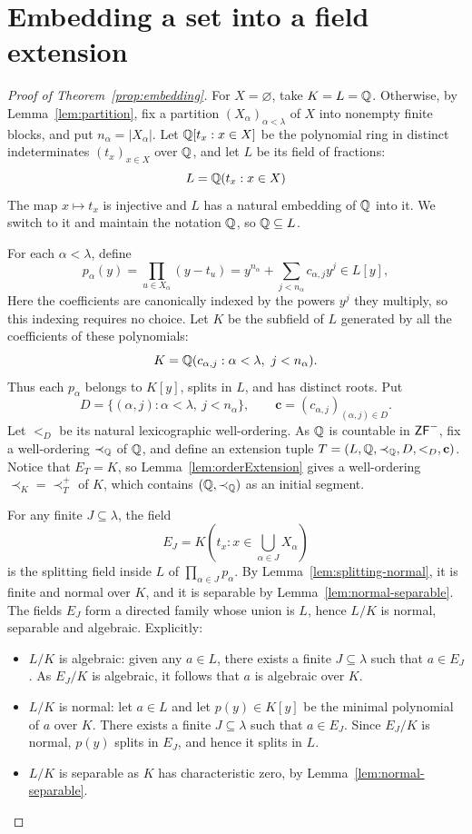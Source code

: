 \section{Embedding a set into a field extension}\label{sec:main-proof}

\begin{proof}[Proof of Theorem~\ref{prop:embedding}]
For $X=\varnothing$, take $K=L=\mathbb Q$. Otherwise, by
Lemma~\ref{lem:partition}, fix a partition $(X_\alpha)_{\alpha<\lambda}$ of $X$ into nonempty finite blocks, and put $n_\alpha=|X_\alpha|$.
Let $\mathbb Q[t_x:x\in X]$ be the polynomial ring in distinct indeterminates $(t_x)_{x\in X}$ over $\mathbb Q$, and let $L$ be its field of fractions:
\[
 L=\mathbb Q(t_x:x\in X)
\]
The map $x\mapsto t_x$ is injective and $L$ has a natural embedding of $\mathbb Q$ into it.
We switch to it and maintain the notation $\mathbb Q$, so $\mathbb Q\subseteq L$.

For each $\alpha<\lambda$, define
\[
 p_\alpha(y)=\prod_{u\in X_\alpha}(y-t_u)
            =y^{n_\alpha}+\sum_{j<n_\alpha}c_{\alpha,j}y^j
            \in L[y],
\]
Here the coefficients are canonically indexed by the powers $y^j$ they
multiply, so this indexing requires no choice.
Let $K$ be the subfield of $L$ generated by all the coefficients
of these polynomials:
\[
 K=\Q(c_{\alpha,j}:\alpha<\lambda,\ j<n_\alpha).
\]
Thus each $p_\alpha$ belongs to $K[y]$, splits in $L$, and has distinct roots.
Put
\[
 D=\{(\alpha,j):\alpha<\lambda,\ j<n_\alpha\},
 \qquad \mathbf c=(c_{\alpha,j})_{(\alpha,j)\in D}.
\]
Let $<_D$ be its natural lexicographic well-ordering.
As $\mathbb Q$ is countable in $\mathsf{ZF}^{-}$, fix a well-ordering $\prec_{\mathbb Q}$ of $\mathbb Q$,
and define an extension tuple $T=(L,\mathbb Q,\prec_{\mathbb Q},D,<_D,\mathbf c)$.
Notice that $E_T=K$, so Lemma~\ref{lem:orderExtension} gives a well-ordering
$\prec_K=\prec_T^+$ of $K$, which contains $(\mathbb Q,\prec_{\mathbb Q})$
as an initial segment.

For any finite
$J\subseteq\lambda$, the field
\[
 E_J=K(t_x:x\in\bigcup_{\alpha\in J}X_\alpha)
\]
is the splitting field inside $L$ of
$\prod_{\alpha\in J}p_\alpha$. By Lemma~\ref{lem:splitting-normal},
it is finite and normal over $K$, and it is separable by Lemma~\ref{lem:normal-separable}. The fields $E_J$ form a directed family
whose union is $L$, hence $L/K$ is normal, separable and algebraic.
Explicitly:
\begin{itemize}
    \item $L/K$ is algebraic: given any $a \in L$, there exists a finite $J\subseteq\lambda$ such that $a\in E_J$.
    As $E_J/K$ is algebraic, it follows that $a$ is algebraic over $K$.
    \item $L/K$ is normal: let $a \in L$ and let $p(y)\in K[y]$ be the minimal polynomial of $a$ over $K$. There exists a finite $J\subseteq\lambda$ such that $a\in E_J$. Since $E_J/K$ is normal, $p(y)$ splits in $E_J$, and hence it splits in $L$.
    \item $L/K$ is separable as $K$ has characteristic zero, by Lemma~\ref{lem:normal-separable}.
\end{itemize}
\end{proof}

